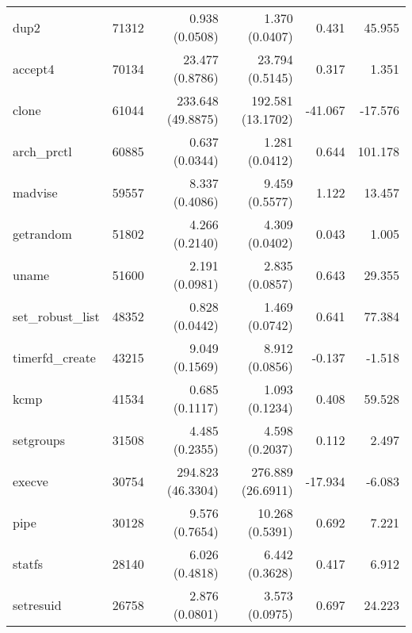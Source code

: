 \begin{longtable}{>{\ttfamily}lrrrrr}
                           dup2 &      71312 &           0.938 (0.0508) &           1.370 (0.0407) &           0.431 &       45.955 \\
                        accept4 &      70134 &          23.477 (0.8786) &          23.794 (0.5145) &           0.317 &        1.351 \\
                          clone &      61044 &        233.648 (49.8875) &        192.581 (13.1702) &         -41.067 &      -17.576 \\
                    arch\_prctl &      60885 &           0.637 (0.0344) &           1.281 (0.0412) &           0.644 &      101.178 \\
                        madvise &      59557 &           8.337 (0.4086) &           9.459 (0.5577) &           1.122 &       13.457 \\
                      getrandom &      51802 &           4.266 (0.2140) &           4.309 (0.0402) &           0.043 &        1.005 \\
                          uname &      51600 &           2.191 (0.0981) &           2.835 (0.0857) &           0.643 &       29.355 \\
              set\_robust\_list &      48352 &           0.828 (0.0442) &           1.469 (0.0742) &           0.641 &       77.384 \\
                timerfd\_create &      43215 &           9.049 (0.1569) &           8.912 (0.0856) &          -0.137 &       -1.518 \\
                           kcmp &      41534 &           0.685 (0.1117) &           1.093 (0.1234) &           0.408 &       59.528 \\
                      setgroups &      31508 &           4.485 (0.2355) &           4.598 (0.2037) &           0.112 &        2.497 \\
                         execve &      30754 &        294.823 (46.3304) &        276.889 (26.6911) &         -17.934 &       -6.083 \\
                           pipe &      30128 &           9.576 (0.7654) &          10.268 (0.5391) &           0.692 &        7.221 \\
                         statfs &      28140 &           6.026 (0.4818) &           6.442 (0.3628) &           0.417 &        6.912 \\
                      setresuid &      26758 &           2.876 (0.0801) &           3.573 (0.0975) &           0.697 &       24.223 \\

\end{longtable}
